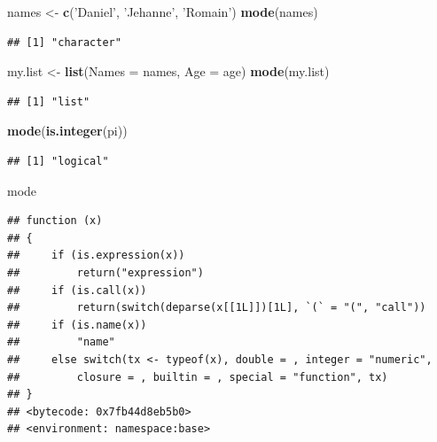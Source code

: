 \documentclass[]{book}
\newenvironment{Shaded}{\begin{snugshade}}{\end{snugshade}}
\newcommand{\DataTypeTok}[1]{\textcolor[rgb]{0.13,0.29,0.53}{#1}}
\newcommand{\KeywordTok}[1]{\textcolor[rgb]{0.13,0.29,0.53}{\textbf{#1}}}
\newcommand{\NormalTok}[1]{#1}
\newcommand{\StringTok}[1]{\textcolor[rgb]{0.31,0.60,0.02}{#1}}
\begin{document}
\begin{Shaded}
\begin{Highlighting}[]
\NormalTok{names <-}\StringTok{ }\KeywordTok{c}\NormalTok{(}\StringTok{'Daniel'}\NormalTok{, }\StringTok{'Jehanne'}\NormalTok{, }\StringTok{'Romain'}\NormalTok{)}
\KeywordTok{mode}\NormalTok{(names)}
\end{Highlighting}
\end{Shaded}

\begin{verbatim}
## [1] "character"
\end{verbatim}

\begin{Shaded}
\begin{Highlighting}[]
\NormalTok{my.list <-}\StringTok{ }\KeywordTok{list}\NormalTok{(}\DataTypeTok{Names =}\NormalTok{ names, }\DataTypeTok{Age =}\NormalTok{ age)}
\KeywordTok{mode}\NormalTok{(my.list)}
\end{Highlighting}
\end{Shaded}

\begin{verbatim}
## [1] "list"
\end{verbatim}

\begin{Shaded}
\begin{Highlighting}[]
\KeywordTok{mode}\NormalTok{(}\KeywordTok{is.integer}\NormalTok{(pi))}
\end{Highlighting}
\end{Shaded}

\begin{verbatim}
## [1] "logical"
\end{verbatim}

\begin{Shaded}
\begin{Highlighting}[]
\NormalTok{mode}
\end{Highlighting}
\end{Shaded}

\begin{verbatim}
## function (x) 
## {
##     if (is.expression(x)) 
##         return("expression")
##     if (is.call(x)) 
##         return(switch(deparse(x[[1L]])[1L], `(` = "(", "call"))
##     if (is.name(x)) 
##         "name"
##     else switch(tx <- typeof(x), double = , integer = "numeric", 
##         closure = , builtin = , special = "function", tx)
## }
## <bytecode: 0x7fb44d8eb5b0>
## <environment: namespace:base>
\end{verbatim}
\end{document}
